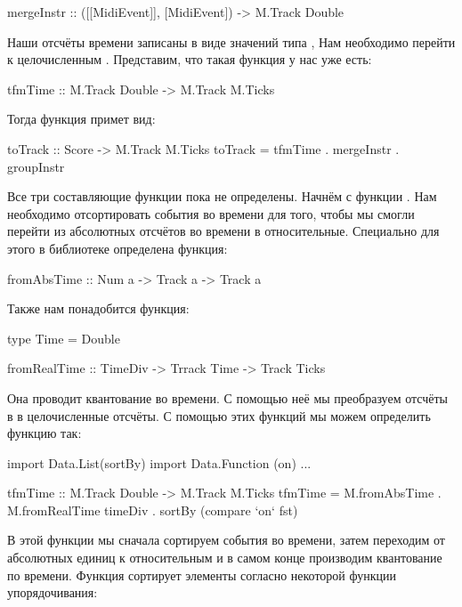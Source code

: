 \begin{code}
mergeInstr :: ([[MidiEvent]], [MidiEvent]) -> M.Track Double
\end{code}

Наши отсчёты времени записаны в виде значений типа 
, Нам необходимо перейти к целочисленным .
Представим, что такая функция у нас уже есть:

\begin{code}
tfmTime :: M.Track Double -> M.Track M.Ticks
\end{code}

Тогда функция  примет вид:

\begin{code}
toTrack :: Score -> M.Track M.Ticks
toTrack = tfmTime . mergeInstr . groupInstr
\end{code}

Все три составляющие функции пока не определены.
Начнём с функции . Нам необходимо отсортировать 
события во времени для того, чтобы мы смогли перейти из 
абсолютных отсчётов во времени в относительные. 
Специально для этого в библиотеке   определена функция:

\begin{code}
fromAbsTime :: Num a -> Track a -> Track a
\end{code}

Также нам понадобится функция:

\begin{code}
type Time = Double

fromRealTime :: TimeDiv -> Trrack Time -> Track Ticks
\end{code}

Она проводит квантование во времени. С помощью неё 
мы преобразуем отсчёты в  в целочисленные отсчёты.
С помощью этих функций мы можем определить функцию 
так:

\begin{code}
import Data.List(sortBy)
import Data.Function (on)
...

tfmTime :: M.Track Double -> M.Track M.Ticks
tfmTime = M.fromAbsTime . M.fromRealTime timeDiv . 
    sortBy (compare `on` fst)
\end{code}

В этой функции мы сначала сортируем события во времени,
затем переходим от абсолютных единиц к относительным
и в самом конце производим квантование по времени.
Функция  сортирует элементы согласно
некоторой функции упорядочивания:  

